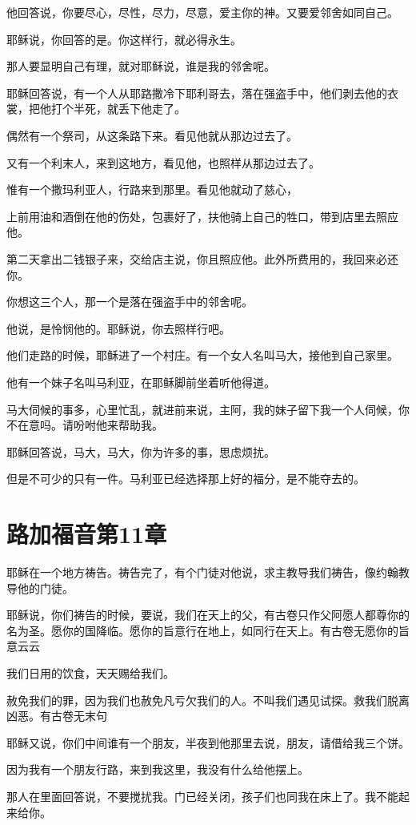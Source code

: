 \documentclass[12pt,oneside]{book}
\begin{document}
他回答说，你要尽心，尽性，尽力，尽意，爱主你的神。又要爱邻舍如同自己。

耶稣说，你回答的是。你这样行，就必得永生。

那人要显明自己有理，就对耶稣说，谁是我的邻舍呢。

耶稣回答说，有一个人从耶路撒冷下耶利哥去，落在强盗手中，他们剥去他的衣裳，把他打个半死，就丢下他走了。

偶然有一个祭司，从这条路下来。看见他就从那边过去了。

又有一个利末人，来到这地方，看见他，也照样从那边过去了。

惟有一个撒玛利亚人，行路来到那里。看见他就动了慈心，

上前用油和酒倒在他的伤处，包裹好了，扶他骑上自己的牲口，带到店里去照应他。

第二天拿出二钱银子来，交给店主说，你且照应他。此外所费用的，我回来必还你。

你想这三个人，那一个是落在强盗手中的邻舍呢。

他说，是怜悯他的。耶稣说，你去照样行吧。

他们走路的时候，耶稣进了一个村庄。有一个女人名叫马大，接他到自己家里。

他有一个妹子名叫马利亚，在耶稣脚前坐着听他得道。

马大伺候的事多，心里忙乱，就进前来说，主阿，我的妹子留下我一个人伺候，你不在意吗。请吩咐他来帮助我。

耶稣回答说，马大，马大，你为许多的事，思虑烦扰。

但是不可少的只有一件。马利亚已经选择那上好的福分，是不能夺去的。

\chapter{路加福音第11章}
耶稣在一个地方祷告。祷告完了，有个门徒对他说，求主教导我们祷告，像约翰教导他的门徒。

耶稣说，你们祷告的时候，要说，我们在天上的父，有古卷只作父阿愿人都尊你的名为圣。愿你的国降临。愿你的旨意行在地上，如同行在天上。有古卷无愿你的旨意云云

我们日用的饮食，天天赐给我们。

赦免我们的罪，因为我们也赦免凡亏欠我们的人。不叫我们遇见试探。救我们脱离凶恶。有古卷无末句

耶稣又说，你们中间谁有一个朋友，半夜到他那里去说，朋友，请借给我三个饼。

因为我有一个朋友行路，来到我这里，我没有什么给他摆上。

那人在里面回答说，不要搅扰我。门已经关闭，孩子们也同我在床上了。我不能起来给你。
\end{document}
